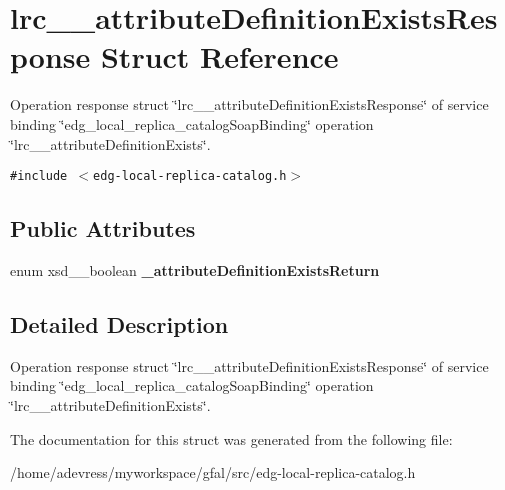 \section{lrc\_\-\_\-attribute\-Definition\-Exists\-Response Struct Reference}
\label{structlrc____attributeDefinitionExistsResponse}
Operation response struct \char`\"{}lrc\_\-\_\-attribute\-Definition\-Exists\-Response\char`\"{} of service binding \char`\"{}edg\_\-local\_\-replica\_\-catalog\-Soap\-Binding\char`\"{} operation \char`\"{}lrc\_\-\_\-attribute\-Definition\-Exists\char`\"{}.  


{\tt \#include $<$edg-local-replica-catalog.h$>$}

\subsection*{Public Attributes}
\begin{CompactItemize}
\item 
enum xsd\_\-\_\-boolean \textbf{\_\-attribute\-Definition\-Exists\-Return}\label{structlrc____attributeDefinitionExistsResponse_b5147599cc4f1fb1fd023a6990538a32}

\end{CompactItemize}


\subsection{Detailed Description}
Operation response struct \char`\"{}lrc\_\-\_\-attribute\-Definition\-Exists\-Response\char`\"{} of service binding \char`\"{}edg\_\-local\_\-replica\_\-catalog\-Soap\-Binding\char`\"{} operation \char`\"{}lrc\_\-\_\-attribute\-Definition\-Exists\char`\"{}. 



The documentation for this struct was generated from the following file:\begin{CompactItemize}
\item 
/home/adevress/myworkspace/gfal/src/edg-local-replica-catalog.h\end{CompactItemize}
